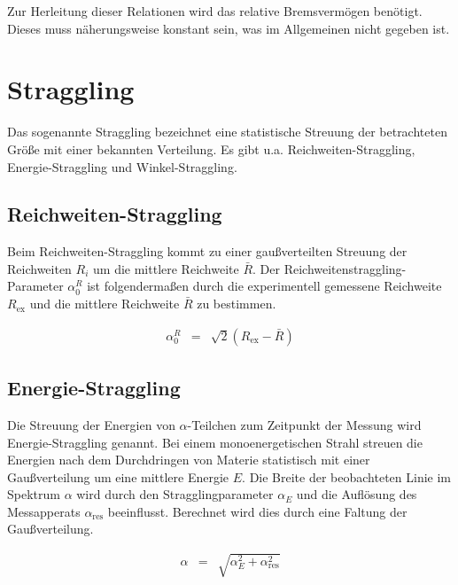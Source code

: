\documentclass[12pt,a4paper]{scrartcl}
\numberwithin{equation}{section} %
\renewcommand{\[}{} %
\renewcommand{\]}{\noindent} %
\begin{document}
Zur Herleitung dieser Relationen wird das relative Bremsvermögen
benötigt. Dieses muss näherungsweise konstant sein, was im Allgemeinen
nicht gegeben ist.

\hypertarget{straggling}{%
\section{Straggling}\label{straggling}}

Das sogenannte Straggling bezeichnet eine statistische Streuung der
betrachteten Größe mit einer bekannten Verteilung. Es gibt u.a.
Reichweiten-Straggling, Energie-Straggling und Winkel-Straggling.

\hypertarget{reichweiten-straggling}{%
\subsection{Reichweiten-Straggling}\label{reichweiten-straggling}}

Beim Reichweiten-Straggling kommt zu einer gaußverteilten Streuung der
Reichweiten $R_i$ um die mittlere Reichweite $\bar{R}$. Der
Reichweitenstraggling-Parameter $\alpha^R_0$ ist folgendermaßen durch
die experimentell gemessene Reichweite $R_\mathrm{ex}$ und die
mittlere Reichweite $\bar{R}$ zu bestimmen.

\[
\begin{eqnarray}
        \alpha^R_0 &=& \sqrt{2}\left(R_\mathrm{ex}-\bar{R}\right)
\end{eqnarray}
\]

\hypertarget{energie-straggling}{%
\subsection{Energie-Straggling}\label{energie-straggling}}

Die Streuung der Energien von $\alpha$-Teilchen zum Zeitpunkt der
Messung wird Energie-Straggling genannt. Bei einem monoenergetischen
Strahl streuen die Energien nach dem Durchdringen von Materie
statistisch mit einer Gaußverteilung um eine mittlere Energie $E$. Die
Breite der beobachteten Linie im Spektrum $\alpha$ wird durch den
Stragglingparameter $\alpha_E$ und die Auflösung des Messapperats
$\alpha_\mathrm{res}$ beeinflusst. Berechnet wird dies durch eine
Faltung der Gaußverteilung.

\[
\begin{eqnarray}
        \alpha &=& \sqrt{\alpha_E^2 + \alpha_\mathrm{res}^2}
\end{eqnarray}
\]
\end{document}
